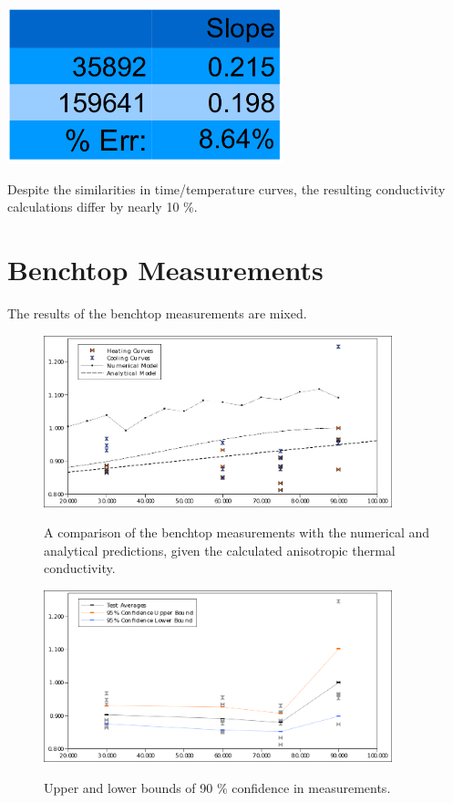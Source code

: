 \begin{table}[h]
\centering
\includegraphics[width=0.6\textwidth]{fig/conv_kvals.png}
\label{tab:conv_kvals}
\caption{Despite the similarities in time/temperature curves, the resulting 
conductivity calculations differ by nearly 10 \%.}
\end{table}

\section{Benchtop Measurements}

The results of the benchtop measurements are mixed.

\begin{figure}[h]
\centering
\includegraphics[width=0.9\textwidth]{fig/test_results.png}
\label{fig:test_results}
\caption{A comparison of the benchtop measurements with the numerical and
analytical predictions, given the calculated anisotropic thermal conductivity.}
\end{figure}

\begin{figure}[h]
\centering
\includegraphics[width=0.9\textwidth]{fig/test_results_confidence.png}
\label{fig:test_confidence}
\caption{Upper and lower bounds of 90 \% confidence in measurements.}
\end{figure}

